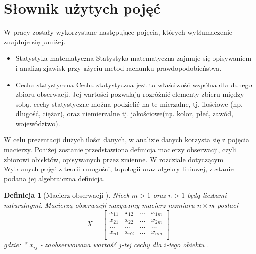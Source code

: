 \documentclass[12pt,a4paper]{report}
\newtheorem{definition}[theorem]{Definicja}
\begin{document}
\begin{itemize}


\end{itemize}


\section{Słownik użytych pojęć}
W pracy zostały wykorzystane następujące pojęcia, których wytłumaczenie znajduje się poniżej. 
\begin{itemize}
\item Statystyka matematyczna \cite[w oparciu o rozdział 1]{krysicki1999}
Statystyka matematyczna zajmuje się opisywaniem i analizą zjawisk przy użyciu metod rachunku prawdopodobieństwa. 


 
 
\item Cecha statystyczna \cite[Rozdział 1]{krysicki1999}
Cecha statystyczna jest to właściwość wspólna dla danego zbioru obserwacji. Jej wartości pozwalają rozróżnić elementy zbioru między sobą. cechy statystyczne można podzielić na te mierzalne, tj. ilościowe (np. długość, ciężar), oraz niemierzalne tj. jakościowe(np. kolor, płeć, zawód, województwo).

\end{itemize}

W celu prezentacji dużych ilości danych, w analizie danych korzysta się z pojęcia macierzy. Poniżej zostanie przedstawiona definicja macierzy obserwacji, czyli zbiorowi obiektów, opisywanych przez zmienne. W rozdziale dotyczącym Wybranych pojęć z teorii mnogości, topologii oraz algebry liniowej, zostanie podana jej algebraiczna definicja. 


\begin{definition}[{Macierz obserwacji \cite[Rozdział 2]{mlodak2006}}]
Niech $m>1$ oraz $n>1$ będą liczbami naturalnymi.  Macierzą obserwacji nazywamy macierz rozmiaru  $n \times m$  postaci
$$
X= \begin{bmatrix}
x_{11} & x_{12} & \ldots & x_{1m} \\
x_{21} & x_{22} & \ldots & x_{2m}\\
\ldots & \ldots & \ldots & \ldots \\
x_{n1} & x_{n2} & \ldots & x_{nm}\\
\end{bmatrix}
$$
gdzie:
* $x_{ij}$ - zaobserwowana wartość $j$-tej cechy dla $i$-tego obiektu .
\end{definition}
\end{document}
